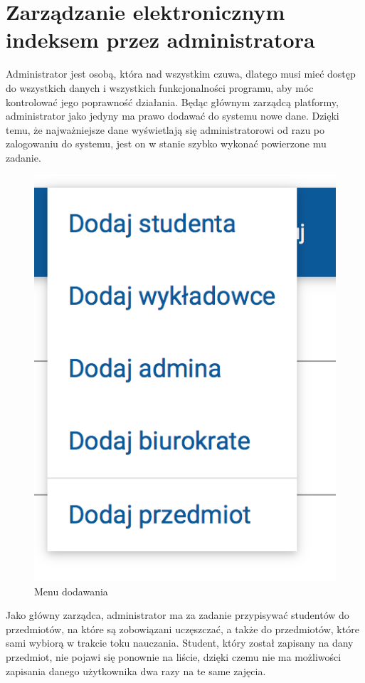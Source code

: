 \documentclass{xmgr}
\begin{document}
\section{Zarządzanie elektronicznym indeksem przez administratora}

\indent \indent \indent Administrator jest osobą, która nad wszystkim czuwa, dlatego musi mieć dostęp do wszystkich danych i wszystkich funkcjonalności programu, aby móc kontrolować jego poprawność działania. Będąc głównym zarządcą platformy, administrator jako jedyny ma prawo dodawać do systemu nowe dane. Dzięki temu, że najważniejsze dane wyświetlają się administratorowi od razu po zalogowaniu do systemu, jest on w stanie szybko wykonać powierzone mu zadanie.

\begin{figure}[th!]
\centering
\includegraphics[scale=0.6]{images/menu.png}
\caption{Menu dodawania\label{RYS.4}}
\end{figure}


\noindent Jako główny zarządca, administrator ma za zadanie przypisywać studentów do przedmiotów, na które są zobowiązani uczęszczać, a także do przedmiotów, które sami wybiorą w trakcie toku nauczania. Student, który został zapisany na dany przedmiot, nie pojawi się ponownie na liście, dzięki czemu nie ma możliwości zapisania danego użytkownika dwa razy na te same zajęcia.
\end{document}
